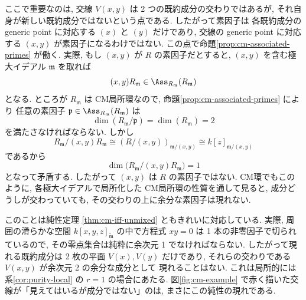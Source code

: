 \documentclass[article,paper=b5paper]{jlreq}
\begin{document}
ここで重要なのは, 交線 $V(x,y)$ は 2 つの既約成分の交わりではあるが,
それ自身が新しい既約成分ではないという点である. したがって素因子は
各既約成分の generic point に対応する $(x)$ と $(y)$ だけであり, 交線の generic point に対応する
$(x,y)$ が素因子になるわけではない. この点で命題\ref{prop:cm-associated-primes} が働く.
実際, もし $(x,y)$ が $R$ の素因子だとすると, $(x,y)$ を含む極大イデアル $\mathfrak{m}$ を取れば
\[
    (x,y)R_{\mathfrak{m}} \in \Ass_{R_{\mathfrak{m}}}(R_{\mathfrak{m}})
\]
となる. ところが $R_{\mathfrak{m}}$ は CM局所環なので, 命題\ref{prop:cm-associated-primes} により
任意の素因子 $\mathfrak{p}\in \Ass_{R_{\mathfrak{m}}}(R_{\mathfrak{m}})$ は
\[
    \dim(R_{\mathfrak{m}}/\mathfrak{p})=\dim(R_{\mathfrak{m}})=2
\]
を満たさなければならない. しかし
\[
    R_{\mathfrak{m}}/(x,y)R_{\mathfrak{m}}
    \cong (R/(x,y))_{\mathfrak{m}/(x,y)}
    \cong k[z]_{\mathfrak{m}/(x,y)}
\]
であるから
\[
    \dim\bigl(R_{\mathfrak{m}}/(x,y)R_{\mathfrak{m}}\bigr)=1
\]
となって矛盾する. したがって $(x,y)$ は $R$ の素因子ではない.
CM環でもこのように, 各極大イデアルで局所化した CM局所環の性質を通して見ると,
成分どうしが交わっていても, その交わりの上に余分な素因子は現れない.

このことは純性定理 \ref{thm:cm-iff-unmixed} ともきれいに対応している.
実際, 周囲の滑らかな空間
$k[x,y,z]_{\widetilde{\mathfrak{m}}}$ の中で方程式 $xy=0$ は 1 本の非零因子で切られているので,
その零点集合は純粋に余次元 1 でなければならない. したがって現れる既約成分は 2 枚の平面
$V(x),V(y)$ だけであり, それらの交わりである $V(x,y)$ が余次元 2 の余分な成分として
現れることはない. これは局所的には 系\ref{cor:purity-local} の $r=1$ の場合にあたる.
図\ref{fig:cm-example} で赤く描いた交線が「見えてはいるが成分ではない」のは, まさにこの純性の現れである.

\vspace{2\baselineskip}
\end{document}
